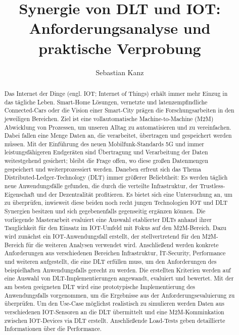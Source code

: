 \documentclass[
    ngerman,american
    ]{scrartcl}
\title{
        Synergie von DLT und IOT: Anforderungsanalyse und praktische Verprobung
        \\  \Large{\paperSubTitle{\lang}}} %
\author{
        Sebastian Kanz
        }
\begin{document}
\maketitle
\begin{abstract}
	Das Internet der Dinge (engl. IOT; Internet of Things) erhält immer mehr Einzug in das tägliche Leben. Smart-Home Lösungen, vernetzte und latenzempfindliche Connected-Cars oder die Vision einer Smart-City prägen die Forschungsarbeiten in den jeweiligen Bereichen. Ziel ist eine vollautomatische Machine-to-Machine (M2M) Abwicklung von Prozessen, um unseren Alltag zu automatisieren und zu vereinfachen. Dabei fallen eine Menge Daten an, die verarbeitet, übertragen und gespeichert werden müssen. Mit der Einführung des neuen Mobilfunk-Standards 5G und immer leistungsfähigeren Endgeräten sind Übertragung und Verarbeitung der Daten weitestgehend gesichert; bleibt die Frage offen, wo diese großen Datenmengen gespeichert und weiterprozessiert werden.
	Daneben erfreut sich das Thema Distributed-Ledger-Technology (DLT) immer größerer Beliebtheit: Es werden täglich neue Anwendungsfälle gefunden, die durch die verteilte Infrastruktur, der Trustless-Eigenschaft und der Dezentralität profitieren. Es bietet sich eine Untersuchung an, um zu überprüfen, inwieweit diese beiden noch recht jungen Technologien IOT und DLT Synergien besitzen und sich gegebenenfalls gegenseitig ergänzen können.
	Die vorliegende Masterarbeit evaluiert eine Auswahl etablierter DLTs anhand ihrer Tauglichkeit für den Einsatz im IOT-Umfeld mit Fokus auf den M2M-Bereich. Dazu wird zunächst ein IOT-Anwendungsfall erstellt, der stellvertretend für den M2M-Bereich für die weiteren Analysen verwendet wird. Anschließend werden konkrete Anforderungen aus verschiedenen Bereichen Infrastruktur, IT-Security, Performance und weiteren aufgestellt, die eine DLT erfüllen muss, um den Anforderungen des beispielhaften Anwendungsfalls gerecht zu werden. Die erstellten Kriterien werden auf eine Auswahl von DLT-Implementierungen angewandt, evaluiert und bewertet. Mit der am besten geeigneten DLT wird eine prototypische Implementierung des Anwendungsfalls vorgenommen, um die Ergebnisse aus der Anforderungsevaluierung zu überprüfen. Um den Use-Case möglichst realistisch zu simulieren werden Daten aus verschiedenen IOT-Sensoren an die DLT übermittelt und eine M2M-Komminkation zwischen IOT-Devices via DLT erstellt. Anschließende Load-Tests geben detaillierte Informationen über die Performance.

\end{abstract}
\end{document}
